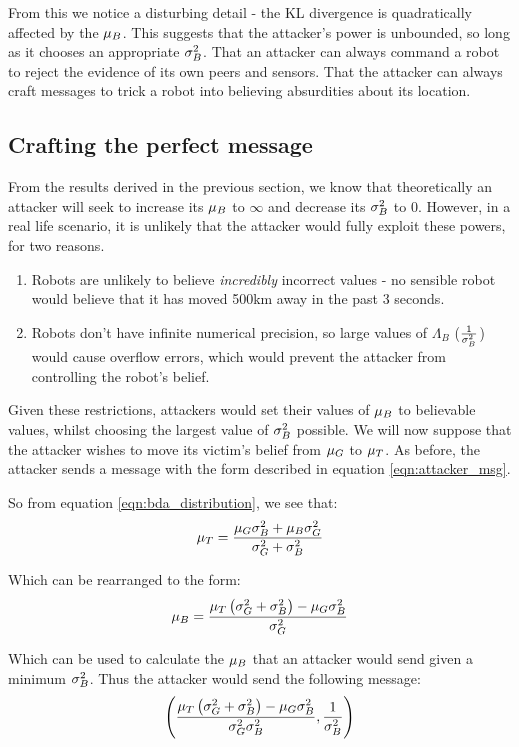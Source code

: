 From this we notice a disturbing detail - the KL divergence is quadratically affected by the $\mu_B$. 
This suggests that the attacker's power is unbounded, so long as it chooses an appropriate $\sigma_B^2$. That an attacker can always command a robot to reject the evidence of its own peers and sensors. 
That the attacker can always craft messages to trick a robot into believing absurdities about its location.

\subsection{Crafting the perfect message}
From the results derived in the previous section, we know that theoretically an attacker will seek to increase its $\mu_B$ to $\infty$ and decrease its $\sigma_B^2$ to 0. 
However, in a real life scenario, it is unlikely that the attacker would fully exploit these powers, for two reasons.
\begin{enumerate}
    \item Robots are unlikely to believe \textit{incredibly} incorrect values - no sensible robot would believe that it has moved 500km away in the past 3 seconds.
    \item Robots don't have infinite numerical precision, so large values of $\Lambda_B$ ($\frac{1}{\sigma_B^2}$) would cause overflow errors, which would prevent the attacker from controlling the robot's belief.
\end{enumerate}

Given these restrictions, attackers would set their values of $\mu_B$ to believable values, whilst choosing the largest value of $\sigma_B^2$ possible. 
We will now suppose that the attacker wishes to move its victim's belief from $\mu_G$ to $\mu_T$. 
As before, the attacker sends a message with the form described in equation \ref{eqn:attacker_msg}.

So from equation \ref{eqn:bda_distribution}, we see that:
\begin{equation}
    \mu_T = \frac{\mu_G\sigma_B^2 + \mu_B\sigma_G^2}{\sigma_G^2 + \sigma_B^2}
\end{equation}

Which can be rearranged to the form:
\begin{equation}
    \mu_B = \frac{\mu_T\left(\sigma_G^2 + \sigma_B^2\right) - \mu_G\sigma_B^2}{\sigma_G^2}
\end{equation}

Which can be used to calculate the $\mu_B$ that an attacker would send given a minimum $\sigma_B^2$. 
Thus the attacker would send the following message:
\begin{equation}
    \left(\frac{\mu_T\left(\sigma_G^2 + \sigma_B^2\right) - \mu_G\sigma_B^2}{\sigma_G^2\sigma_B^2}, \frac{1}{\sigma_B^2}\right)
\end{equation}

